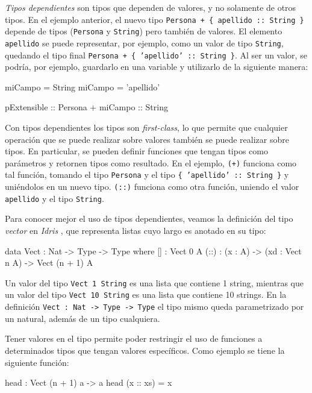 \textit{Tipos dependientes} son tipos que dependen de valores, y no solamente de otros tipos. En el ejemplo anterior, el nuevo tipo \texttt{Persona + \{ apellido :: String \}} depende de tipos (\texttt{Persona} y \texttt{String}) pero también de valores. El elemento \texttt{apellido} se puede representar, por ejemplo, como un valor de tipo \texttt{String}, quedando el tipo final \texttt{Persona + \{ 'apellido' :: String \}}. Al ser un valor, se podría, por ejemplo, guardarlo en una variable y utilizarlo de la siguiente manera:

\begin{code}
miCampo = String
miCampo = 'apellido'

pExtensible :: Persona + { miCampo :: String }
\end{code}

Con tipos dependientes los tipos son \textit{first-class}, lo que permite que cualquier operación que se puede realizar sobre valores también se puede realizar sobre tipos. En particular, se pueden definir funciones que tengan tipos como parámetros y retornen tipos como resultado. En el ejemplo, \texttt{(+)} funciona como tal función, tomando el tipo \texttt{Persona} y el tipo \texttt{\{ 'apellido' :: String \}} y uniéndolos en un nuevo tipo. \texttt{(::)} funciona como otra función, uniendo el valor \texttt{apellido} y el tipo \texttt{String}.

Para conocer mejor el uso de tipos dependientes, veamos la definición del tipo \textit{vector} en  \textit{Idris} \cite{brady:idris-jfp13}, que representa listas cuyo largo es anotado en su tipo:

\begin{code}
data Vect : Nat -> Type -> Type where
  [] : Vect 0 A
  (::) : (x : A) -> (xd : Vect n A) -> Vect (n + 1) A
\end{code}

Un valor del tipo \texttt{Vect 1 String} es una lista que contiene 1 string, mientras que un valor del tipo \texttt{Vect 10 String} es una lista que contiene 10 strings. En la definición \texttt{Vect : Nat -> Type -> Type} el tipo mismo queda parametrizado por un natural, además de un tipo cualquiera.

Tener valores en el tipo permite poder restringir el uso de funciones a determinados tipos que tengan valores específicos. Como ejemplo se tiene la siguiente función:

\begin{code}
head : Vect (n + 1) a -> a
head (x :: xs) = x
\end{code}

